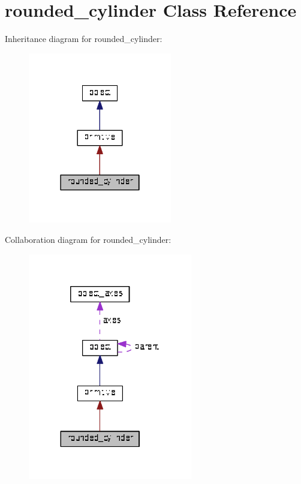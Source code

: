 \hypertarget{classrounded__cylinder}{}\section{rounded\+\_\+cylinder Class Reference}
\label{classrounded__cylinder}


Inheritance diagram for rounded\+\_\+cylinder\+:\nopagebreak
\begin{figure}[H]
\begin{center}
\leavevmode
\includegraphics[width=178pt]{classrounded__cylinder__inherit__graph}
\end{center}
\end{figure}


Collaboration diagram for rounded\+\_\+cylinder\+:\nopagebreak
\begin{figure}[H]
\begin{center}
\leavevmode
\includegraphics[width=203pt]{classrounded__cylinder__coll__graph}
\end{center}
\end{figure}
